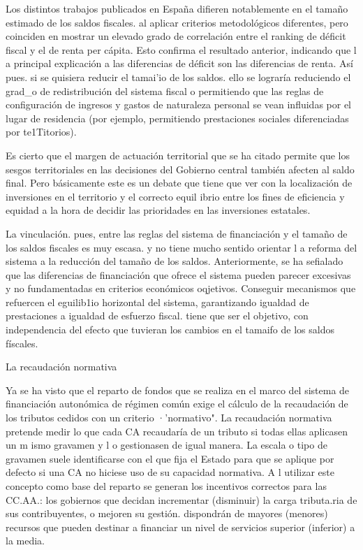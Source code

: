 \documentclass[10pt,a4paper]{article}
\begin{document}
{Los distintos trabajos publicados en España difieren notablemente en el tamaño estimado de los saldos fiscales. al aplicar criterios metodológicos diferentes, pero coinciden en mostrar un elevado grado de correlación entre el ranking de déficit fiscal y el de renta per cápita. Esto confirma el resultado anterior, indicando que l a principal explicación a las diferencias de déficit son las diferencias de renta. Así pues. si se quisiera reducir el tamai'io de los saldos. ello se lograría reduciendo el grad_o de redistribución del sistema fiscal o permitiendo que las reglas de configuración de ingresos y gastos de naturaleza personal se vean influidas por el lugar de residencia (por ejemplo, permitiendo prestaciones sociales diferenciadas por te1Titorios).

Es cierto que el margen de actuación territorial que se ha citado permite que los sesgos territoriales en las decisiones del Gobierno central también afecten al saldo final. Pero básicamente este es un debate que tiene que ver con la localización de inversiones en el territorio y el correcto equil ibrio entre los fines de eficiencia y equidad a la hora de decidir las prioridades en las inversiones estatales.

La vinculación. pues, entre las reglas del sistema de financiación y el tamaño de los saldos fiscales es muy escasa. y no tiene mucho sentido orientar l a reforma del sistema a la reducción del tamaño de los saldos. Anteriormente, se ha sefialado que las diferencias de financiación que ofrece el sistema pueden parecer excesivas y no fundamentadas en criterios económicos oqjetivos. Conseguir mecanismos que refuercen el eguilib1io horizontal del sistema, garantizando igualdad de prestaciones a igualdad de esfuerzo fiscal. tiene que ser el objetivo, con independencia del efecto que tuvieran los cambios en el tamaifo de los saldos físcales.

La recaudación normativa

Ya se ha visto que el reparto de fondos que se realiza en el marco del sistema de financiación autonómica de régimen común exige el cálculo de la recaudación de los tributos cedidos con un criterio ·'normativo". La recaudación normativa pretende medir lo que cada CA recaudaría de un tributo si todas ellas aplicasen un m ismo gravamen y l o gestionasen de igual manera. La escala o tipo de gravamen suele identificarse con el que fija el Estado para que se aplique por defecto si una CA no hiciese uso de su capacidad normativa. A l utilizar este concepto como base del reparto se generan los incentivos correctos para las CC.AA.: los gobiernos que decidan incrementar (disminuir) la carga tributa.ria de sus contribuyentes, o mejoren su gestión. dispondrán de mayores (menores) recursos que pueden destinar a financiar un nivel de servicios superior (inferior) a la media.

}
\end{document}
